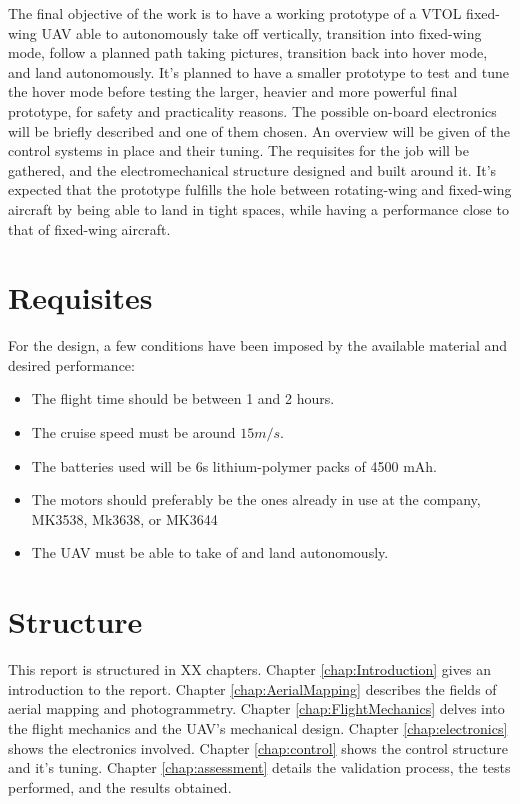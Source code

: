 %
The final objective of the work is to have a working prototype of a VTOL fixed-wing UAV able to autonomously take off vertically, transition into fixed-wing mode, follow a planned path taking pictures, transition back into hover mode, and land autonomously.
%
It's planned to have a smaller prototype to test and tune the hover mode before testing the larger, heavier and more powerful final prototype, for safety and practicality reasons.
%
The possible on-board electronics will be briefly described and one of them chosen.
%
An overview will be given of the control systems in place and their tuning.
%
The requisites for the job will be gathered, and the electromechanical structure designed and built around it.
%
It's expected that the prototype fulfills the hole between rotating-wing and fixed-wing aircraft by being able to land in tight spaces, while having a performance close to that of fixed-wing aircraft.

\section{Requisites}

For the design, a few conditions have been imposed by the available material and desired performance:

\begin{itemize}

\item The flight time should be between 1 and 2 hours.
\item The cruise speed must be around $15 m/s$.
\item The batteries used will be 6s lithium-polymer packs of 4500 mAh.
\item The motors should preferably be the ones already in use at the company, MK3538, Mk3638, or MK3644
\item The UAV must be able to take of and land autonomously.

\end{itemize}


\section{Structure}
	
%
This report is structured in XX  chapters.
%
Chapter \ref{chap:Introduction} gives an introduction to the report.
%
Chapter \ref{chap:AerialMapping} describes the fields of aerial mapping and photogrammetry.
%
Chapter \ref{chap:FlightMechanics} delves into the flight mechanics and the UAV's mechanical design.
%
Chapter \ref{chap:electronics} shows the electronics involved.
%
Chapter \ref{chap:control} shows the control structure and it's tuning.
%
Chapter \ref{chap:assessment} details the validation process, the tests performed, and the results obtained.

